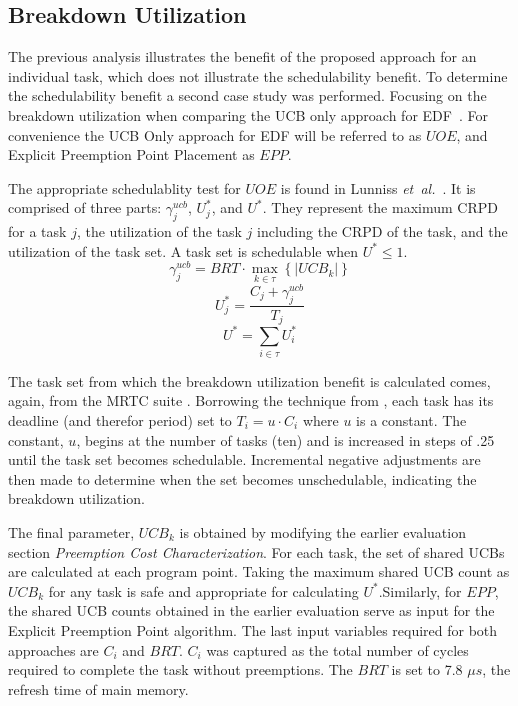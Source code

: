 \subsection{Breakdown Utilization}

The previous analysis illustrates the benefit of the proposed
approach for an individual task, which does not illustrate the
schedulability benefit. To determine the schedulability benefit a
second case study was performed. Focusing on the breakdown utilization
when comparing the UCB only approach for EDF~\cite{lunniss:13}. For
convenience the UCB Only approach for EDF will be referred to as
${UOE}$, and Explicit Preemption Point Placement as ${EPP}$.

The appropriate schedulablity test for ${UOE}$ is found in
Lunniss \emph{et~al.}~\cite{lunniss:13}. It is comprised of three
parts: ${\gamma^{ucb}_j}$, ${U^*_j}$, and ${U^*}$. They represent
the maximum CRPD for a task ${j}$, the utilization of the task ${j}$
including the CRPD of the task, and the utilization of the task set.
A task set is schedulable when ${U^* \le 1}$.
\begin{equation}
  \gamma^{ucb}_j = BRT \cdot \max\limits_{k \in \tau}
  \left\{ \left| UCB_k \right| \right\}
\end{equation}
\begin{equation}
  U^*_j = \frac{C_j + \gamma^{ucb}_j}{T_j}
\end{equation}
\begin{equation}
  U^* = \sum_{i \in \tau} U^*_i
\end{equation}

The task set from which the breakdown utilization benefit is
calculated comes, again, from the MRTC suite \cite{mrtc:01}. Borrowing
the technique from \cite{lunniss:13}, each task has its deadline (and
therefor period) set to ${T_i = u \cdot C_i}$
where ${u}$ is a constant. The constant, ${u}$, begins at the number
of tasks (ten) and is increased in steps of .25 until the task set
becomes schedulable. Incremental negative adjustments are then made to
determine when the set becomes unschedulable, indicating the breakdown
utilization.

The final parameter, ${UCB_k}$ is obtained by modifying the earlier
evaluation section \emph{Preemption Cost Characterization}. For each
task, the set of shared UCBs are calculated at each program
point. Taking the maximum shared UCB count as ${UCB_k}$ for any task
is safe and appropriate for calculating ${U^*}$.Similarly, for ${EPP}$,
the shared UCB counts obtained in the earlier evaluation serve as input for
the Explicit Preemption Point algorithm.  The last input variables required
for both approaches are ${C_i}$ and ${BRT}$. ${C_i}$ was captured as the
total number of cycles required to complete the task without preemptions.
The ${BRT}$ is set to 7.8 ${{\mu}s}$, the refresh time of main memory.

